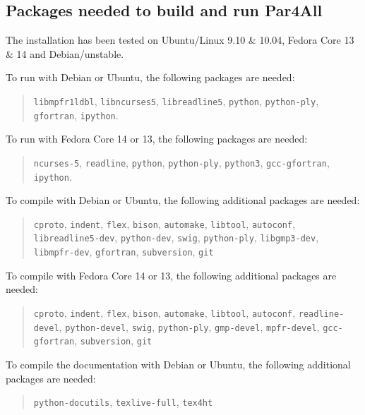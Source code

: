 \documentclass[a4paper]{article}
\begin{document}
\subsection{Packages needed to build and run Par4All}
\label{sec:pack-need-build}

The installation has been tested on Ubuntu/Linux 9.10 \& 10.04,
Fedora Core 13 \& 14 and Debian/unstable.

To run \Apfa with Debian or Ubuntu, the following packages are needed:
\begin{quote}
  \texttt{libmpfr1ldbl},
  \texttt{libncurses5}, \texttt{libreadline5}, \texttt{python},
  \texttt{python-ply}, \texttt{gfortran},
  \texttt{ipython}.
\end{quote}

To run \Apfa with Fedora Core 14 or 13, the following packages are needed:
\begin{quote}
  \texttt{ncurses-5}, \texttt{readline}, \texttt{python},
  \texttt{python-ply}, \texttt{python3}, \texttt{gcc-gfortran},
  \texttt{ipython}.
\end{quote}


To compile \Apfa with Debian or Ubuntu, the following additional
packages are needed:
\begin{quote}
  \texttt{cproto}, \texttt{indent}, \texttt{flex}, \texttt{bison},
  \texttt{automake}, \texttt{libtool}, \texttt{autoconf},
  \texttt{libreadline5-dev}, \texttt{python-dev}, \texttt{swig},
  \texttt{python-ply}, \texttt{libgmp3-dev},
  \texttt{libmpfr-dev}, \texttt{gfortran}, \texttt{subversion},
  \texttt{git}
\end{quote}

To compile \Apfa with Fedora Core 14 or 13, the following additional
packages are needed:
\begin{quote}
  \texttt{cproto}, \texttt{indent}, \texttt{flex}, \texttt{bison},
  \texttt{automake}, \texttt{libtool}, \texttt{autoconf},
  \texttt{readline-devel}, \texttt{python-devel}, \texttt{swig},
  \texttt{python-ply}, \texttt{gmp-devel},
  \texttt{mpfr-devel}, \texttt{gcc-gfortran}, \texttt{subversion},
  \texttt{git}
\end{quote}


To compile the documentation with Debian or Ubuntu, the following
additional packages are needed:
\begin{quote}
  \texttt{python-docutils}, \texttt{texlive-full}, \texttt{tex4ht}
\end{quote}
\end{document}
